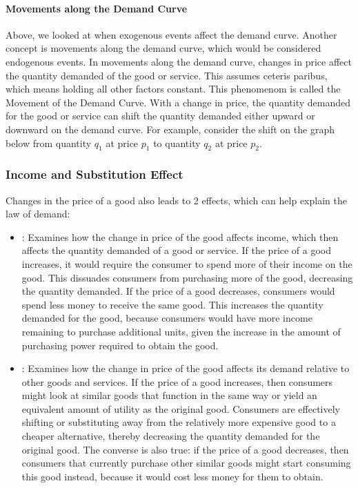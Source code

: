 \documentclass[letterpaper,10pt,english]{jupyterBook}
\begin{document}
\noindent{}


\paragraph{Movements along the Demand Curve}
\label{\detokenize{content/01-demand/01-demand:movements-along-the-demand-curve}}
\sphinxAtStartPar
Above, we looked at when exogenous events affect the demand curve. Another concept is movements along the demand curve, which would be considered endogenous events. In movements along the demand curve, changes in price affect the quantity demanded of the good or service. This assumes ceteris paribus, which means holding all other factors constant. This phenomenom is called the Movement of the Demand Curve. With a change in price, the quantity demanded for the good or service can shift the quantity demanded either upward or downward on the demand curve. For example, consider the shift on the graph below from quantity \(q_1\) at price \(p_1\) to quantity \(q_2\) at price \(p_2\).

\noindent{}


\subsubsection{Income and Substitution Effect}
\label{\detokenize{content/01-demand/01-demand:income-and-substitution-effect}}
\sphinxAtStartPar
Changes in the price of a good also leads to 2 effects, which can help explain the law of demand:
\begin{itemize}
\item {} 
\sphinxAtStartPar
{}: Examines how the change in price of the good affects income, which then affects the quantity demanded of a good or service. If the price of a good increases, it would require the consumer to spend more of their income on the good. This dissuades consumers from purchasing more of the good, decreasing the quantity demanded. If the price of a good decreases, consumers would spend less money to receive the same good. This increases the quantity demanded for the good, because consumers would have more income remaining to purchase additional units, given the increase in the amount of purchasing power required to obtain the good.

\item {} 
\sphinxAtStartPar
{}: Examines how the change in price of the good affects its demand relative to other goods and services. If the price of a good increases, then consumers might look at similar goods that function in the same way or yield an equivalent amount of utility as the original good. Consumers are effectively shifting or substituting away from the relatively more expensive good to a cheaper alternative, thereby decreasing the quantity demanded for the original good. The converse is also true: if the price of a good decreases, then consumers that currently purchase other similar goods might start consuming this good instead, because it would cost less money for them to obtain.

\end{itemize}
\end{document}
